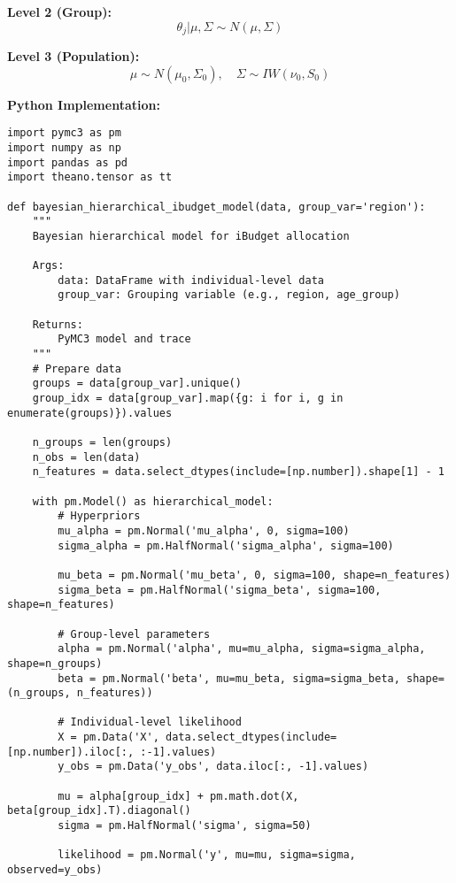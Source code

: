 \documentclass[12pt]{article}
\begin{document}
\textbf{Level 2 (Group):}
\begin{equation}
\theta_j | \mu, \Sigma \sim N(\mu, \Sigma)
\end{equation}

\textbf{Level 3 (Population):}
\begin{equation}
\mu \sim N(\mu_0, \Sigma_0), \quad \Sigma \sim IW(\nu_0, S_0)
\end{equation}

\textbf{Python Implementation:}
\begin{lstlisting}
import pymc3 as pm
import numpy as np
import pandas as pd
import theano.tensor as tt

def bayesian_hierarchical_ibudget_model(data, group_var='region'):
    """
    Bayesian hierarchical model for iBudget allocation
    
    Args:
        data: DataFrame with individual-level data
        group_var: Grouping variable (e.g., region, age_group)
    
    Returns:
        PyMC3 model and trace
    """
    # Prepare data
    groups = data[group_var].unique()
    group_idx = data[group_var].map({g: i for i, g in enumerate(groups)}).values
    
    n_groups = len(groups)
    n_obs = len(data)
    n_features = data.select_dtypes(include=[np.number]).shape[1] - 1
    
    with pm.Model() as hierarchical_model:
        # Hyperpriors
        mu_alpha = pm.Normal('mu_alpha', 0, sigma=100)
        sigma_alpha = pm.HalfNormal('sigma_alpha', sigma=100)
        
        mu_beta = pm.Normal('mu_beta', 0, sigma=100, shape=n_features)
        sigma_beta = pm.HalfNormal('sigma_beta', sigma=100, shape=n_features)
        
        # Group-level parameters
        alpha = pm.Normal('alpha', mu=mu_alpha, sigma=sigma_alpha, shape=n_groups)
        beta = pm.Normal('beta', mu=mu_beta, sigma=sigma_beta, shape=(n_groups, n_features))
        
        # Individual-level likelihood
        X = pm.Data('X', data.select_dtypes(include=[np.number]).iloc[:, :-1].values)
        y_obs = pm.Data('y_obs', data.iloc[:, -1].values)
        
        mu = alpha[group_idx] + pm.math.dot(X, beta[group_idx].T).diagonal()
        sigma = pm.HalfNormal('sigma', sigma=50)
        
        likelihood = pm.Normal('y', mu=mu, sigma=sigma, observed=y_obs)
        

\end{lstlisting}
\end{document}
